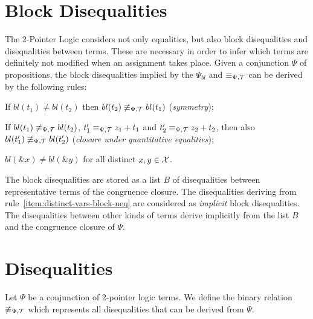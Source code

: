 \section{Block Disequalities}\label{section:block-disequalities}

The 2-Pointer Logic considers not only equalities, but also block disequalities and disequalities between terms.
These are necessary in order to infer which terms are definitely not
modified when an assignment takes place.
Given a conjunction $\Psi$ of propositions, the block disequalities implied by the $\Psi_{bl}$
and $\equiv_{\Psi,\mathcal{T}}$ can be derived by the following rules:

\begin{enumerate}[label={[B\arabic*]}, ref={[B\arabic*]}]
    \setcounter{enumi}{-1} %
    \item	If $bl(t_1)\neq bl(t_2)$ then $bl(t_2)\not\equiv_{\Psi,\mathcal{T}} bl(t_1)$ (\emph{symmetry});
          \item\label{item:closure-under-quantitative-equalities}
          If $bl(t_1)\not\equiv_{\Psi,\mathcal{T}} bl(t_2)$, $t'_1 \equiv_{\Psi,\mathcal{T}} z_1+t_1$ and $t'_2\equiv_{\Psi,\mathcal{T}} z_2+t_2$, then
          also $bl(t'_1)\not\equiv_{\Psi,\mathcal{T}} bl(t'_2)$ (\emph{closure under quantitative equalities});
          \item\label{item:distinct-vars-block-neq} $bl(\&x) \neq bl(\&y)$ for all distinct $x, y \in \mathcal{X}$.
\end{enumerate}

The block disequalities are stored as a list $B$ of disequalities between representative terms
of the congruence closure.
The disequalities deriving from rule~\ref{item:distinct-vars-block-neq} are considered as \emph{implicit} block disequalities.
The disequalities between other kinds of terms derive implicitly from the list $B$ and the congruence closure of $\Psi$.

\section{Disequalities}\label{section:disequalities}

Let $\Psi$ be a conjunction of 2-pointer logic terms.
We define the binary relation $\not\equiv_{\Psi,\mathcal{T}}$ which represents all disequalities that can be derived from $\Psi$.

